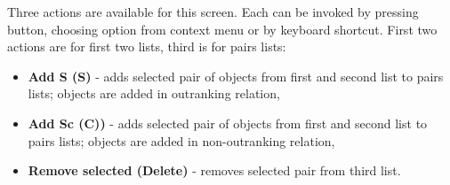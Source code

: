 Three actions are available for this screen. Each can be invoked by pressing button, choosing option from context menu or by keyboard shortcut. First two actions are for first two lists, third is for pairs lists:
\begin{itemize}
	\item \textbf{Add S (S)} - adds selected pair of objects from first and second list to pairs lists; objects are added in outranking relation,
	\item \textbf{Add Sc (C))} - adds selected pair of objects from first and second list to pairs lists; objects are added in non-outranking relation,
	\item \textbf{Remove selected (Delete)} - removes selected pair from third list.
\end{itemize}



\vfill\newpage